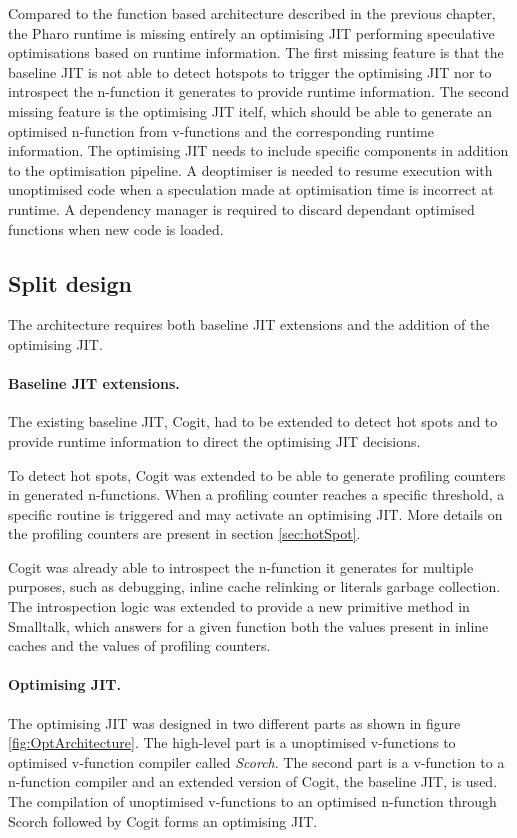 \documentclass[a4paper,12pt,twoside]{../includes/ThesisStyle}
\begin{document}
Compared to the function based architecture described in the previous chapter, the Pharo runtime is missing entirely an optimising JIT performing speculative optimisations based on runtime information. The first missing feature is that the baseline JIT is not able to detect hotspots to trigger the optimising JIT nor to introspect the n-function it generates to provide runtime information. The second missing feature is the optimising JIT itelf, which should be able to generate an optimised n-function from v-functions and the corresponding runtime information. The optimising JIT needs to include specific components in addition to the optimisation pipeline. A deoptimiser is needed to resume execution with unoptimised code when a speculation made at optimisation time is incorrect at runtime. A dependency manager is required to discard dependant optimised functions when new code is loaded.

\subsection{Split design}
\label{sec:splitDesign}

The architecture requires both baseline JIT extensions and the addition of the optimising JIT.

\paragraph{Baseline JIT extensions.}
The existing baseline JIT, Cogit, had to be extended to detect hot spots and to provide runtime information to direct the optimising JIT decisions. 

To detect hot spots, Cogit was extended to be able to generate profiling counters in generated n-functions. When a profiling counter reaches a specific threshold, a specific routine is triggered and may activate an optimising JIT. More details on the profiling counters are present in section \ref{sec:hotSpot}.

Cogit was already able to introspect the n-function it generates for multiple purposes, such as debugging, inline cache relinking or literals garbage collection. The introspection logic was extended to provide a new primitive method in Smalltalk, which answers for a given function both the values present in inline caches and the values of profiling counters.

\paragraph{Optimising JIT.}
The optimising JIT was designed in two different parts as shown in figure \ref{fig:OptArchitecture}. The high-level part is a unoptimised v-functions to optimised v-function compiler called \emph{Scorch}. The second part is a v-function to a n-function compiler and an extended version of Cogit, the baseline JIT, is used. The compilation of unoptimised v-functions to an optimised n-function through Scorch followed by Cogit forms an optimising JIT.
\end{document}
